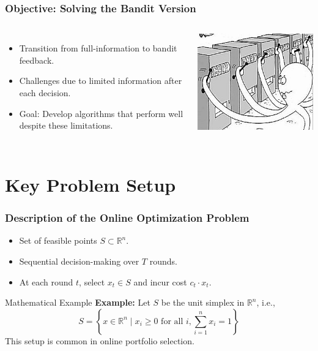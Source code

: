 \documentclass{beamer}
\begin{document}
\begin{frame}
\frametitle{Objective: Solving the Bandit Version}
\begin{columns}
    \begin{itemize}
        \item Transition from full-information to bandit feedback.
        \item Challenges due to limited information after each decision.
        \item Goal: Develop algorithms that perform well despite these limitations.
    \end{itemize}
    \includegraphics[width=\textwidth]{images/bandit_setting.jpg} %
\end{columns}
\end{frame}

\section{Key Problem Setup}

\begin{frame}
\frametitle{Description of the Online Optimization Problem}
\begin{itemize}
    \item Set of feasible points \( S \subset \mathbb{R}^n \).
    \item Sequential decision-making over \( T \) rounds.
    \item At each round \( t \), select \( x_t \in S \) and incur cost \( c_t \cdot x_t \).
\end{itemize}
\begin{exampleblock}{Mathematical Example}
    \textbf{Example:} Let \( S \) be the unit simplex in \( \mathbb{R}^n \), i.e.,
    \[
    S = \left\{ x \in \mathbb{R}^n \mid x_i \geq 0 \text{ for all } i, \sum_{i=1}^n x_i = 1 \right\}
    \]
    This setup is common in online portfolio selection.
\end{exampleblock}
\end{frame}
\end{document}
